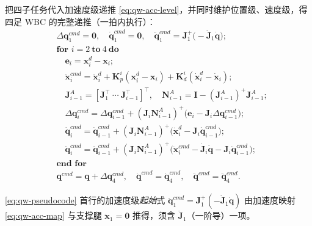 把四子任务代入加速度级递推 \cref{eq:qw-acc-level}，并同时维护位置级、速度级，得四足 WBC 的完整递推（一拍内执行）\cite{yu2021quadruped}：
\begin{equation}
\begin{aligned}
&\Delta\boldsymbol{q}_1^{cmd}=\mathbf{0},\quad \dot{\boldsymbol{q}}_1^{cmd}=\mathbf{0},\quad \ddot{\boldsymbol{q}}_1^{cmd}=\boldsymbol{J}_1^+\big(-\dot{\boldsymbol{J}}_1\dot{\boldsymbol{q}}\big);\\
&\textbf{for } i=2\ \textbf{to}\ 4\ \textbf{do}\\
&\quad \boldsymbol{e}_i=\boldsymbol{x}_i^d-\boldsymbol{x}_i;\\
&\quad \ddot{\boldsymbol{x}}_i^{cmd}=\ddot{\boldsymbol{x}}_i^d+\boldsymbol{K}_p^i(\boldsymbol{x}_i^d-\boldsymbol{x}_i)+\boldsymbol{K}_d^i(\dot{\boldsymbol{x}}_i^d-\dot{\boldsymbol{x}}_i);\\
&\quad \boldsymbol{J}_{i-1}^{A}=[\boldsymbol{J}_1^\top\ \cdots\ \boldsymbol{J}_{i-1}^\top]^\top,\quad \boldsymbol{N}_{i-1}^{A}=\mathbf{I}-(\boldsymbol{J}_{i-1}^{A})^+\boldsymbol{J}_{i-1}^{A};\\
&\quad \Delta\boldsymbol{q}_i^{cmd}=\Delta\boldsymbol{q}_{i-1}^{cmd}+(\boldsymbol{J}_i\boldsymbol{N}_{i-1}^{A})^+\big(\boldsymbol{e}_i-\boldsymbol{J}_i\Delta\boldsymbol{q}_{i-1}^{cmd}\big);\\
&\quad \dot{\boldsymbol{q}}_i^{cmd}=\dot{\boldsymbol{q}}_{i-1}^{cmd}+(\boldsymbol{J}_i\boldsymbol{N}_{i-1}^{A})^+\big(\dot{\boldsymbol{x}}_i^d-\boldsymbol{J}_i\dot{\boldsymbol{q}}_{i-1}^{cmd}\big);\\
&\quad \ddot{\boldsymbol{q}}_i^{cmd}=\ddot{\boldsymbol{q}}_{i-1}^{cmd}+(\boldsymbol{J}_i\boldsymbol{N}_{i-1}^{A})^+\big(\ddot{\boldsymbol{x}}_i^{cmd}-\dot{\boldsymbol{J}}_i\dot{\boldsymbol{q}}-\boldsymbol{J}_i\ddot{\boldsymbol{q}}_{i-1}^{cmd}\big);\\
&\textbf{end for}\\
&\boldsymbol{q}^{cmd}=\boldsymbol{q}+\Delta\boldsymbol{q}_4^{cmd},\quad \dot{\boldsymbol{q}}^{cmd}=\dot{\boldsymbol{q}}_4^{cmd},\quad \ddot{\boldsymbol{q}}^{cmd}=\ddot{\boldsymbol{q}}_4^{cmd}.
\end{aligned}
\label{eq:qw-pseudocode}
\end{equation}

\cref{eq:qw-pseudocode} 首行的加速度级\emph{起始}式 $\ddot{\boldsymbol{q}}_1^{cmd}=\boldsymbol{J}_1^+(-\dot{\boldsymbol{J}}_1\dot{\boldsymbol{q}})$ 由加速度映射 \cref{eq:qw-acc-map} 与支撑腿 $\ddot{\boldsymbol{x}}_1=\mathbf{0}$ 推得，须含 $\dot{\boldsymbol{J}}_1$（一阶导）一项。

